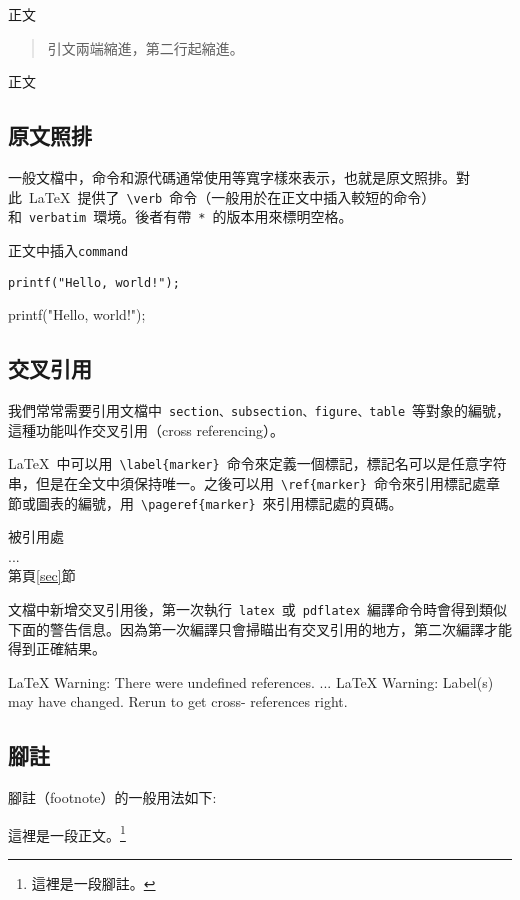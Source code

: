 \begin{demo}
正文
\begin{verse}
引文兩端縮進，第二行起縮進。
\end{verse}
正文
\end{demo}

\subsection{原文照排}
一般文檔中，命令和源代碼通常使用等寬字樣來表示，也就是原文照排。對此~\LaTeX~提供了~\verb|\verb|~命令（一般用於在正文中插入較短的命令）和~\verb|verbatim|~環境。後者有帶~\verb|*|~的版本用來標明空格。

\begin{demo}
正文中插入\verb|command|
\begin{verbatim}
printf("Hello, world!");
\end{verbatim}
\begin{verbatim*}
printf("Hello, world!");
\end{verbatim*}
\end{demo}

\subsection{交叉引用}
我們常常需要引用文檔中~\verb|section、subsection、figure、table|~等對象的編號，這種功能叫作交叉引用（cross referencing）。

\LaTeX~中可以用~\verb|\label{marker}|~命令來定義一個標記，標記名可以是任意字符串，但是在全文中須保持唯一。之後可以用~\verb|\ref{marker}|~命令來引用標記處章節或圖表的編號，用~\verb|\pageref{marker}|~來引用標記處的頁碼。

\begin{demo}
被引用處\label{sec}\\
...\\
第\pageref{sec}頁\ref{sec}節
\end{demo}

文檔中新增交叉引用後，第一次執行~\verb|latex|~或~\verb|pdflatex|~編譯命令時會得到類似下面的警告信息。因為第一次編譯只會掃瞄出有交叉引用的地方，第二次編譯才能得到正確結果。

\begin{code}
LaTeX Warning: There were undefined references.
...
LaTeX Warning: Label(s) may have changed. Rerun to get cross-
references right.
\end{code}

\subsection{腳註}
腳註（footnote）的一般用法如下:
\begin{demo}
這裡是一段正文。\footnote{這裡是一段腳註。}
\end{demo}

